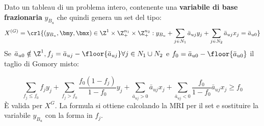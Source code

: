 \documentclass[\main/main.tex]{subfiles}
\begin{document}
\begin{proposition}
    Dato un tableau di un problema intero, contenente una \textbf{variabile di base frazionaria} \(y_{B_u}\) che quindi genera un set del tipo:
    \[
        X^{(G)} = \crl{(y_{B_u}, \bmy, \bmx) \in \Z^1 \times \Z^{n_1}_+ \times \Z^{n_2}_+: y_{B_u} + \sum_{j \in N_1} \bar{a}_{uj}y_j + \sum_{j \in N_2} \bar{a}_{uj}x_j = \bar{a}_{u0}}
    \]
    Se \(\bar{a}_{u0} \notin \Z^1, f_j = \bar{a}_{uj} - \floor{\bar{a}_{uj}} \forall j \in N_1 \cup N_2\) e \(f_0 = \bar{a}_{u0} - \floor{\bar{a}_{u0}}\) il taglio di Gomory misto:

    \[
        \sum_{f_j\leq f_0} f_j y_j + \sum_{f_j > f_0} \frac{f_0(1-f_j)}{1-f_0}y_j + \sum_{\bar{a}_{uj}>0} \bar{a}_{uj} x_j + \sum_{\bar{a}_{uj}<0} \frac{f_0}{1-f_0}\bar{a}_{uj} x_j \geq f_0
    \]
    È valida per \(X^G\). La formula si ottiene calcolando la MRI per il set e sostituire la variabile \(y_{B_u}\) con la forma in \(f_j\).
\end{proposition}
\end{document}
